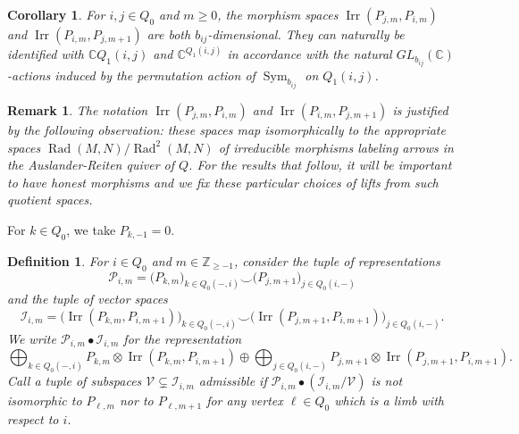 \documentclass{amsart}
\newtheorem{corollary}[theorem]{Corollary}
\newtheorem{definition}[theorem]{Definition}
\newtheorem{remark}[theorem]{Remark}
\numberwithin{equation}{section}
\newcommand{\CC}{\mathbb{C}}
\newcommand{\ZZ}{\mathbb{Z}}
\newcommand{\cI}{\mathcal{I}}
\newcommand{\cP}{\mathcal{P}}
\newcommand{\cV}{\mathcal{V}}
\newcommand{\Irr}{\operatorname{Irr}}
\newcommand{\Rad}{\operatorname{Rad}}
\newcommand{\Sym}{\operatorname{Sym}}
\begin{document}
\begin{corollary}
  For $i,j\in Q_0$ and $m\ge0$, the morphism spaces $\Irr(P_{j,m},P_{i,m})$ and $\Irr(P_{i,m},P_{j,m+1})$ are both $b_{ij}$-dimensional.
  They can naturally be identified with $\CC Q_1(i,j)$ and $\CC^{Q_1(i,j)}$ in accordance with the natural $GL_{b_{ij}}(\CC)$-actions induced by the permutation action of $\Sym_{b_{ij}}$ on $Q_1(i,j)$.
\end{corollary}
\begin{remark}
  The notation $\Irr(P_{j,m},P_{i,m})$ and $\Irr(P_{i,m},P_{j,m+1})$ is justified by the following observation: these spaces map isomorphically to the appropriate spaces $\Rad(M,N)/\Rad^2(M,N)$ of irreducible morphisms labeling arrows in the Auslander-Reiten quiver of $Q$.
  For the results that follow, it will be important to have honest morphisms and we fix these particular choices of lifts from such quotient spaces.
\end{remark}

For $k\in Q_0$, we take $P_{k,-1}=0$.
\begin{definition}
  For $i\in Q_0$ and $m\in\ZZ_{\ge-1}$, consider the tuple of representations 
  \[\cP_{i,m}=\big(P_{k,m}\big)_{k\in Q_0(-,i)} \smile\big(P_{j,m+1}\big)_{j\in Q_0(i,-)}\]
  and the tuple of vector spaces 
  \[\cI_{i,m}=\big(\Irr(P_{k,m},P_{i,m+1})\big)_{k\in Q_0(-,i)} \smile\big(\Irr(P_{j,m+1},P_{i,m+1})\big)_{j\in Q_0(i,-)}.\]
  We write $\cP_{i,m}\bullet\cI_{i,m}$ for the representation
  \[\bigoplus_{k\in Q_0(-,i)} P_{k,m}\otimes \Irr(P_{k,m},P_{i,m+1}) \oplus \bigoplus_{j\in Q_0(i,-)} P_{j,m+1}\otimes\Irr(P_{j,m+1},P_{i,m+1}).\]
  Call a tuple of subspaces $\cV\subsetneq\cI_{i,m}$ \emph{admissible} if $\cP_{i,m}\bullet(\cI_{i,m}/\cV)$ is not isomorphic to $P_{\ell,m}$ nor to $P_{\ell,m+1}$ for any vertex $\ell\in Q_0$ which is a limb with respect to $i$.
\end{definition}
\end{document}
